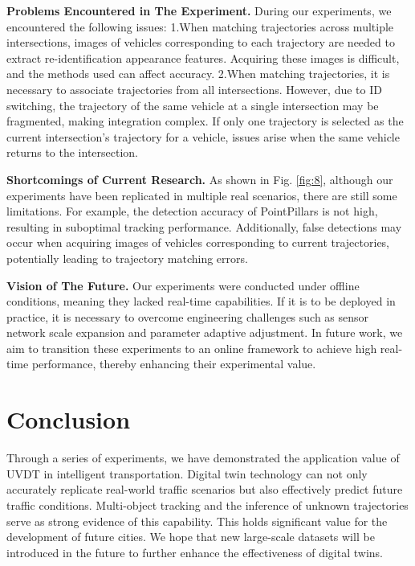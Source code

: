 \documentclass[journal,twoside,web]{ieeecolor}
\begin{document}
\textbf{Problems Encountered in The Experiment.}
During our experiments, we encountered the following issues:  
1.When matching trajectories across multiple intersections, images of vehicles corresponding to each trajectory are needed to extract re-identification appearance features. 
Acquiring these images is difficult, and the methods used can affect accuracy.  
2.When matching trajectories, it is necessary to associate trajectories from all intersections. 
However, due to ID switching, the trajectory of the same vehicle at a single intersection may be fragmented, making integration complex. 
If only one trajectory is selected as the current intersection's trajectory for a vehicle, issues arise when the same vehicle returns to the intersection.

\textbf{Shortcomings of Current Research.}
As shown in Fig. \ref{fig:8}, although our experiments have been replicated in multiple real scenarios, there are still some limitations.
For example, the detection accuracy of PointPillars is not high, resulting in suboptimal tracking performance. 
Additionally, false detections may occur when acquiring images of vehicles corresponding to current trajectories, potentially leading to trajectory matching errors.

\textbf{Vision of The Future.}
Our experiments were conducted under offline conditions, meaning they lacked real-time capabilities. 
If it is to be deployed in practice, it is necessary to overcome engineering challenges such as sensor network scale expansion and parameter adaptive adjustment.
In future work, we aim to transition these experiments to an online framework to achieve high real-time performance, thereby enhancing their experimental value.


\section{Conclusion}

Through a series of experiments, we have demonstrated the application value of UVDT in intelligent transportation. 
Digital twin technology can not only accurately replicate real-world traffic scenarios but also effectively predict future traffic conditions. 
Multi-object tracking and the inference of unknown trajectories serve as strong evidence of this capability. 
This holds significant value for the development of future cities.
We hope that new large-scale datasets will be introduced in the future to further enhance the effectiveness of digital twins.
\end{document}
